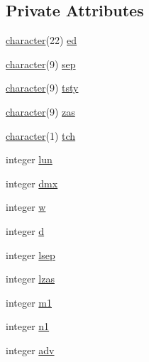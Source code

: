 \subsection*{Private Attributes}
\begin{DoxyCompactItemize}
\item 
\hyperlink{option__stopwatch_83_8txt_abd4b21fbbd175834027b5224bfe97e66}{character}(22) \hyperlink{structm__display__util_1_1settings_a2834b85cc506001092e5c03b0cb99249}{ed}
\item 
\hyperlink{option__stopwatch_83_8txt_abd4b21fbbd175834027b5224bfe97e66}{character}(9) \hyperlink{structm__display__util_1_1settings_ac6b88a3df7505dfda018fa65a5e9f105}{sep}
\item 
\hyperlink{option__stopwatch_83_8txt_abd4b21fbbd175834027b5224bfe97e66}{character}(9) \hyperlink{structm__display__util_1_1settings_aa44c905eb8019728ab7c29a035fffe46}{tsty}
\item 
\hyperlink{option__stopwatch_83_8txt_abd4b21fbbd175834027b5224bfe97e66}{character}(9) \hyperlink{structm__display__util_1_1settings_a2f91c5dcdbb75a1c307fff085d516abc}{zas}
\item 
\hyperlink{option__stopwatch_83_8txt_abd4b21fbbd175834027b5224bfe97e66}{character}(1) \hyperlink{structm__display__util_1_1settings_ab1c6c7523b3660ecda155d49db2b35d3}{tch}
\item 
integer \hyperlink{structm__display__util_1_1settings_af9e99479fa3069b7f5b9a49fad1338ca}{lun}
\item 
integer \hyperlink{structm__display__util_1_1settings_aa0350d08ea4df3bf1ce10823eedbb1ba}{dmx}
\item 
integer \hyperlink{structm__display__util_1_1settings_a20dd8f6afcf787f415d678459d08e3a4}{w}
\item 
integer \hyperlink{structm__display__util_1_1settings_ae723b191970109c2e0885e92cab1d52f}{d}
\item 
integer \hyperlink{structm__display__util_1_1settings_a114dc5a94988d6078b5ee8d4fa8b6a56}{lsep}
\item 
integer \hyperlink{structm__display__util_1_1settings_a8f7f9f26ee7420cae7fde083a9748265}{lzas}
\item 
integer \hyperlink{structm__display__util_1_1settings_a2d229d3d7fe7d0966aa24e2f1f69f058}{m1}
\item 
integer \hyperlink{structm__display__util_1_1settings_a2b84936048353b3a4069bc4add4afbd2}{n1}
\item 
integer \hyperlink{structm__display__util_1_1settings_a48f4987f23486c4d34452ea07536db12}{adv}

\end{DoxyCompactItemize}

